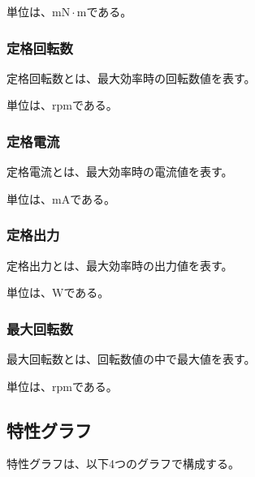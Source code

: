 単位は、$\mathrm{mN \cdot m}$である。
\subsubsection{定格回転数}\label{sub:sub:teikakukaiten}
定格回転数とは、最大効率時の回転数値を表す。

単位は、$\mathrm{rpm}$である。

\subsubsection{定格電流}\label{sub:sub:teikakuden}
定格電流とは、最大効率時の電流値を表す。

単位は、$\mathrm{mA}$である。
\subsubsection{定格出力}\label{sub:sub:teikakusyutu}
定格出力とは、最大効率時の出力値を表す。

単位は、$\mathrm{W}$である。
\subsubsection{最大回転数}\label{sub:sub:saidaikai}
最大回転数とは、回転数値の中で最大値を表す。

単位は、$\mathrm{rpm}$である。
\subsection{特性グラフ}\label{sub:tokuseigurahu}
特性グラフは、以下4つのグラフで構成する。
